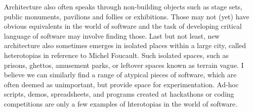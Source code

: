 Architecture also often speaks through
non-building objects such as stage sets, public monuments, pavilions and follies or exhibitions.
Those may not (yet) have obvious equivalents in the world of software and the task of developing
critical language of software may involve finding those. Last but not least, new architecture
also sometimes emerges in isolated places within a large city, called heterotopias in reference
to Michel Foucault. Such isolated spaces, such as prisons, ghettos,
amusement parks, or leftover spaces known as terrain vague.
I believe we can similarly find a range of atypical pieces of software, which are often deemed
as unimportant, but provide space for experimentation. Ad-hoc scripts, demos, spreadsheets,
and programs created at hackathons or coding competitions are only a few examples of hterotopias
in the world of software.

%
%
%
%
%
%
%
%
%
%
%
%

